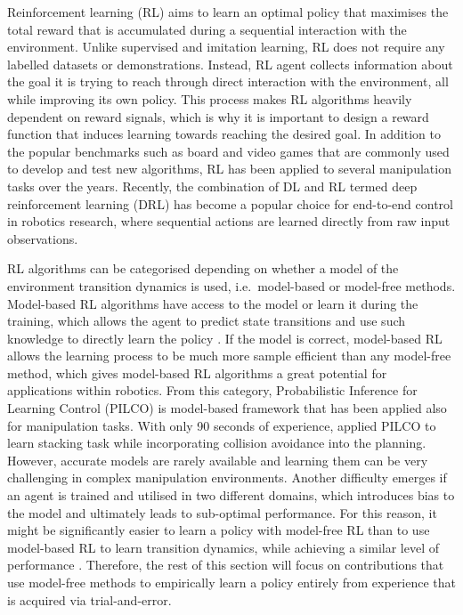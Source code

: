 Reinforcement learning (RL) \cite{sutton_reinforcement_2018} aims to learn an optimal policy that maximises the total reward that is accumulated during a sequential interaction with the environment. Unlike supervised and imitation learning, RL does not require any labelled datasets or demonstrations. Instead, RL agent collects information about the goal it is trying to reach through direct interaction with the environment, all while improving its own policy. This process makes RL algorithms heavily dependent on reward signals, which is why it is important to design a reward function that induces learning towards reaching the desired goal. In addition to the popular benchmarks such as board and video games that are commonly used to develop and test new algorithms, RL has been applied to several manipulation tasks over the years. Recently, the combination of DL and RL termed deep reinforcement learning (DRL) has become a popular choice for end-to-end control in robotics research, where sequential actions are learned directly from raw input observations.

RL algorithms can be categorised depending on whether a model of the environment transition dynamics is used, i.e.~model-based or model-free methods. Model-based RL algorithms have access to the model or learn it during the training, which allows the agent to predict state transitions and use such knowledge to directly learn the policy \cite{polydoros_survey_2017}. If the model is correct, model-based RL allows the learning process to be much more sample efficient than any model-free method, which gives model-based RL algorithms a great potential for applications within robotics. From this category, Probabilistic Inference for Learning Control (PILCO) \cite{deisenroth_pilco_2011} is model-based framework that has been applied also for manipulation tasks. With only 90 seconds of experience, \citet{durrant-whyte_learning_2012} applied PILCO to learn stacking task while incorporating collision avoidance into the planning. However, accurate models are rarely available and learning them can be very challenging in complex manipulation environments. Another difficulty emerges if an agent is trained and utilised in two different domains, which introduces bias to the model and ultimately leads to sub-optimal performance. For this reason, it might be significantly easier to learn a policy with model-free RL than to use model-based RL to learn transition dynamics, while achieving a similar level of performance \cite{kroemer_review_2021}. Therefore, the rest of this section will focus on contributions that use model-free methods to empirically learn a policy entirely from experience that is acquired via trial-and-error.

